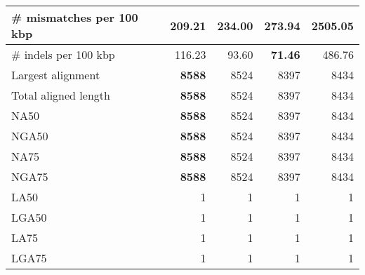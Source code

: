 \documentclass[12pt,a4paper]{article}
\begin{document}
\begin{table}[ht]
\begin{center}
\begin{tabular}{|l*{4}{|r}|}
\# mismatches per 100 kbp & {\bf 209.21} & 234.00 & 273.94 & 2505.05 \\ \hline
\# indels per 100 kbp & 116.23 & 93.60 & {\bf 71.46} & 486.76 \\ \hline
Largest alignment & {\bf 8588} & 8524 & 8397 & 8434 \\ \hline
Total aligned length & {\bf 8588} & 8524 & 8397 & 8434 \\ \hline
NA50 & {\bf 8588} & 8524 & 8397 & 8434 \\ \hline
NGA50 & {\bf 8588} & 8524 & 8397 & 8434 \\ \hline
NA75 & {\bf 8588} & 8524 & 8397 & 8434 \\ \hline
NGA75 & {\bf 8588} & 8524 & 8397 & 8434 \\ \hline
LA50 & 1 & 1 & 1 & 1 \\ \hline
LGA50 & 1 & 1 & 1 & 1 \\ \hline
LA75 & 1 & 1 & 1 & 1 \\ \hline
LGA75 & 1 & 1 & 1 & 1 \\ \hline
\end{tabular}
\end{center}
\end{table}
\end{document}
